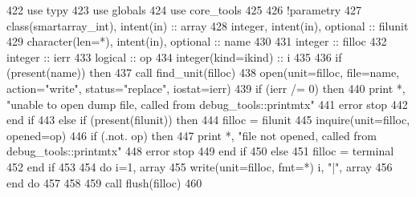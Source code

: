\begin{DoxyCode}
422       \textcolor{keywordtype}{use }typy
423       \textcolor{keywordtype}{use }globals
424       \textcolor{keywordtype}{use }core_tools
425       
426       \textcolor{comment}{!parametry}
427       \textcolor{keywordtype}{class}(smartarray_int), \textcolor{keywordtype}{intent(in)} :: array
428       \textcolor{keywordtype}{integer}, \textcolor{keywordtype}{intent(in)}, \textcolor{keywordtype}{optional} :: filunit   
429       \textcolor{keywordtype}{character(len=*)}, \textcolor{keywordtype}{intent(in)}, \textcolor{keywordtype}{optional} :: name
430 
431       \textcolor{keywordtype}{integer} :: filloc
432       \textcolor{keywordtype}{integer} :: ierr
433       \textcolor{keywordtype}{logical} :: op
434       \textcolor{keywordtype}{integer(kind=ikind)} :: i
435       
436       \textcolor{keywordflow}{if} (\textcolor{keyword}{present}(name)) \textcolor{keywordflow}{then}
437         \textcolor{keyword}{call }find_unit(filloc)
438         \textcolor{keyword}{open}(unit=filloc, file=name, action=\textcolor{stringliteral}{"write"}, status=\textcolor{stringliteral}{"replace"}, iostat\textcolor{comment}{=ierr)}
439 \textcolor{comment}{        }\textcolor{keywordflow}{if} (ierr /= 0) \textcolor{keywordflow}{then}
440           print *, \textcolor{stringliteral}{"unable to open dump file, called from debug\_tools::printmtx"}
441           error stop
442 \textcolor{keywordflow}{        end if}
443       \textcolor{keywordflow}{else} \textcolor{keywordflow}{if} (\textcolor{keyword}{present}(filunit)) \textcolor{keywordflow}{then}
444         filloc = filunit
445         \textcolor{keyword}{inquire}(unit=filloc, opened=op)
446         \textcolor{keywordflow}{if} (.not. op) \textcolor{keywordflow}{then}
447           print *, \textcolor{stringliteral}{"file not opened, called from debug\_tools::printmtx"}
448           error stop
449 \textcolor{keywordflow}{        end if}
450       \textcolor{keywordflow}{else}
451         filloc = terminal
452 \textcolor{keywordflow}{      end if}
453       
454       \textcolor{keywordflow}{do} i=1, array%
455         \textcolor{keyword}{write}(unit=filloc, fmt=*)  i, \textcolor{stringliteral}{"|"}, array%
456 \textcolor{keywordflow}{      end do}
457 
458       
459       \textcolor{keyword}{call }flush(filloc)
460       
\end{DoxyCode}
